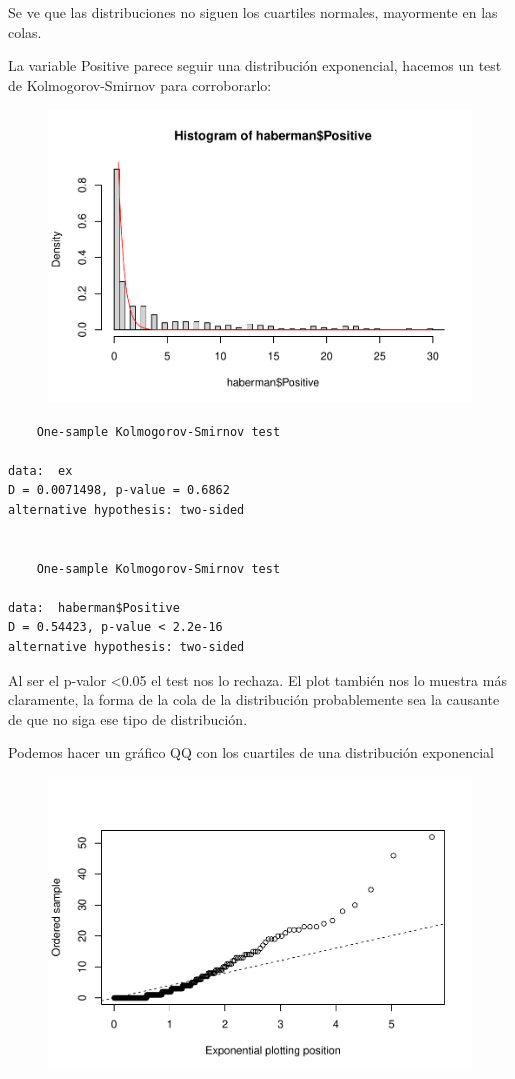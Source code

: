 Se ve que las distribuciones no siguen los cuartiles normales, mayormente en las colas.

La variable Positive parece seguir una distribución exponencial, hacemos un test de Kolmogorov-Smirnov para corroborarlo:

\begin{figure}[H]\includegraphics[width=.9\linewidth]{img/EDA2_files/figure-latex/unnamed-chunk-19-1} \end{figure}

\begin{verbatim}
    One-sample Kolmogorov-Smirnov test

data:  ex
D = 0.0071498, p-value = 0.6862
alternative hypothesis: two-sided


    One-sample Kolmogorov-Smirnov test

data:  haberman$Positive
D = 0.54423, p-value < 2.2e-16
alternative hypothesis: two-sided
\end{verbatim}

Al ser el p-valor \textless0.05 el test nos lo rechaza. El plot también nos lo muestra más claramente, la forma de la cola de la distribución probablemente sea la causante de que no siga ese tipo de distribución.

Podemos hacer un gráfico QQ con los cuartiles de una distribución exponencial

\begin{figure}[H]\includegraphics[width=.9\linewidth]{img/EDA2_files/figure-latex/unnamed-chunk-20-1} \end{figure}

